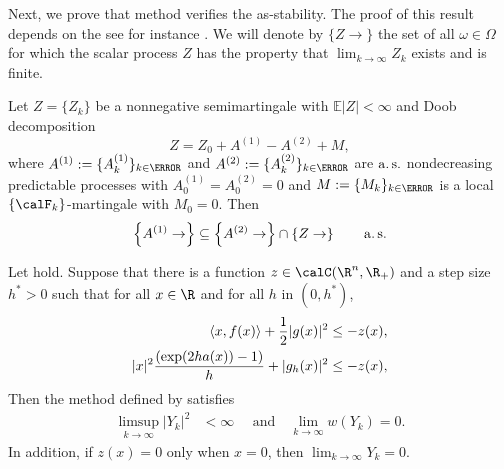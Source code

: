	Next, %
we prove that \SM method verifies the as-stability.
The proof of this result depends on the  see for instance 
\cite[Th. 7, pg. 139]{Liptser1989}.
We will denote by  $\{Z\to\}$ the set of all $\omega \in \Omega$ for which the scalar process $Z$ has the property that
$\lim_{k\to\infty} Z_k$ exists and is finite.
\begin{lem}
	\label{lem:MartingaleConvergence}
	Let $Z= \{Z_k\}$ be a nonnegative semimartingale with $\mathbb{E}|Z|<\infty$ and Doob decomposition 
	$$
		Z = Z_0 + A^{(1)} -A^{(2)} + M,
	$$
	where 
	$A^{(1)}:=\{A_k^{(1)}\}_{k\in \N}$ and $A^{(2)}:=\{A_k^{(2)}\}_{k\in \N}$ are $\operatorname*{a.s.}$ nondecreasing predictable
	processes with $A_0^{(1)}=A_0^{(2)}=0$ and $M:=\{M_k\}_{k\in\N}$ is a local $\{\calF_k\}$-martingale with $M_0=0$.
	Then
	\begin{equation*}
		\left\{
				A^{(1)} \to
		\right\}
		\subseteq
		\left\{
				A^{(2)} \to
		\right\}\cap
		\left\{
			Z \to
		\right\} \qquad \operatorname*{a.s.}
\end{equation*}
\end{lem}
\begin{thm}\label{thm:AlmosSurleyStability}
		Let  hold. Suppose that there is a function 
		$z \in \calC(\R^n,\R_+)$ 
		and a step size $h^*>0$ such that for all $x\in \R$ and for all $h$ in $(0,h^*)$,
		\begin{align} 
			\left\langle x, f(x)\right\rangle + \frac{1}{2}|g(x)|^2
			&\leq -z(x), \label{eqn:ConditionStability1}\\
			|x|^2
			\frac{(\exp(2 h a(x))-1)}{h}
			+|g_h(x)|^2
			&\leq
				-z(x), \label{eqn:ConditionStability2}
		\end{align}
	Then the \SM method defined by  satisfies
	\begin{align*}
		\limsup_{k\to \infty}
			|Y_k|^2 
			& <\infty \quad\text{ and} 
			\quad
		\lim_{k\to \infty}
			w(Y_k) =0. 
	\end{align*}
In addition, if $z(x)=0$ only when $x=0$, then
	$ \displaystyle
		\lim_{k\to \infty} Y_k = 0.
	$
\end{thm}
